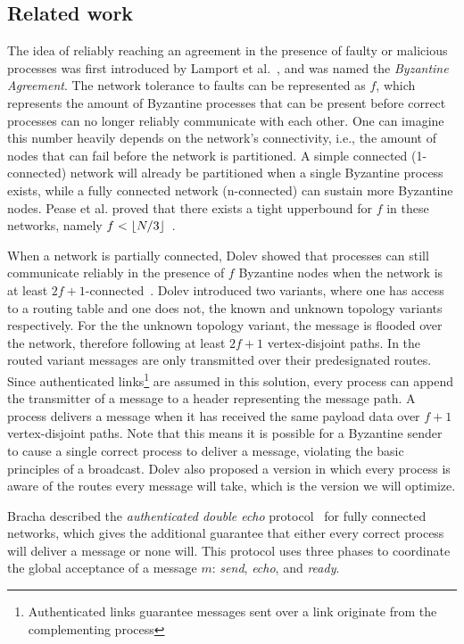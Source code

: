 \subsection*{Related work}
The idea of reliably reaching an agreement in the presence of faulty or malicious processes was first introduced by Lamport et al.~\cite{lamport2019byzantine}, and was named the \textit{Byzantine Agreement}. The network tolerance to faults can be represented as $f$, which represents the amount of Byzantine processes that can be present before correct processes can no longer reliably communicate with each other. One can imagine this number heavily depends on the network's connectivity, i.e., the amount of nodes that can fail before the network is partitioned. A simple connected (1-connected) network will already be partitioned when a single Byzantine process exists, while a fully connected network (n-connected) can sustain more Byzantine nodes. Pease et al. proved that there exists a tight upperbound for $f$ in these networks, namely $f < \lfloor N/3\rfloor$~\cite{pease1980reaching}.

When a network is partially connected, Dolev showed that processes can still communicate reliably in the presence of $f$ Byzantine nodes when the network is at least $2f+1$-connected~\cite{dolev}. Dolev introduced two variants, where one has access to a routing table and one does not, the known and unknown topology variants respectively. For the the unknown topology variant, the message is flooded over the network, therefore following at least $2f+1$ vertex-disjoint paths. In the routed variant messages are only transmitted over their predesignated routes.
Since authenticated links\footnote{Authenticated links guarantee messages sent over a link originate from the complementing process} are assumed in this solution, every process can append the transmitter of a message to a header representing the message path. A process delivers a message when it has received the same payload data over $f+1$ vertex-disjoint paths. Note that this means it is possible for a Byzantine sender to cause a single correct process to deliver a message, violating the basic principles of a broadcast. Dolev also proposed a version in which every process is aware of the routes every message will take, which is the version we will optimize.

Bracha described the \textit{authenticated double echo} protocol~\cite{bracha} for fully connected networks, which gives the additional guarantee that either every correct process will deliver a message or none will. This protocol uses three phases to coordinate the global acceptance of a message $m$: \textit{send}, \textit{echo}, and \textit{ready}.

